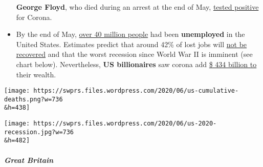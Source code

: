 \begin{itemize}
  \textbf{George Floyd}, who died during an arrest at the end of May,
  \href{https://www.nydailynews.com/coronavirus/ny-coronavirus-george-floyd-20200604-pvhrtjn4mna5blzow3gfx5ag3y-story.html}{tested
  positive} for Corona.
\item
  By the end of May,
  \href{https://www.businessinsider.com/us-weekly-jobless-claims-unemployment-filings-coronavirus-labor-market-layoffs-2020-5}{over
  40 million people} had been \textbf{unemployed} in the United States.
  Estimates predict that around 42\% of lost jobs will
  \href{https://www.forbes.com/sites/kenrapoza/2020/05/15/some-42-of-jobs-lost-in-pandemic-are-gone-for-good/}{not
  be recovered} and that the worst recession since World War II is
  imminent (see chart below). Nevertheless, \textbf{US billionaires} saw
  corona add
  \href{https://www.cnbc.com/2020/05/21/american-billionaires-got-434-billion-richer-during-the-pandemic.html}{\$
  434 billion to} their wealth.
\end{itemize}

\texttt{[image: https://swprs.files.wordpress.com/2020/06/us-cumulative-deaths.png?w=736\\\&h=438]}

\texttt{[image: https://swprs.files.wordpress.com/2020/06/us-2020-recession.jpg?w=736\\\&h=482]}

\hypertarget{great-britain-1}{%
\subparagraph{\texorpdfstring{\textbf{Great
Britain}}{Great Britain}}\label{great-britain-1}}

